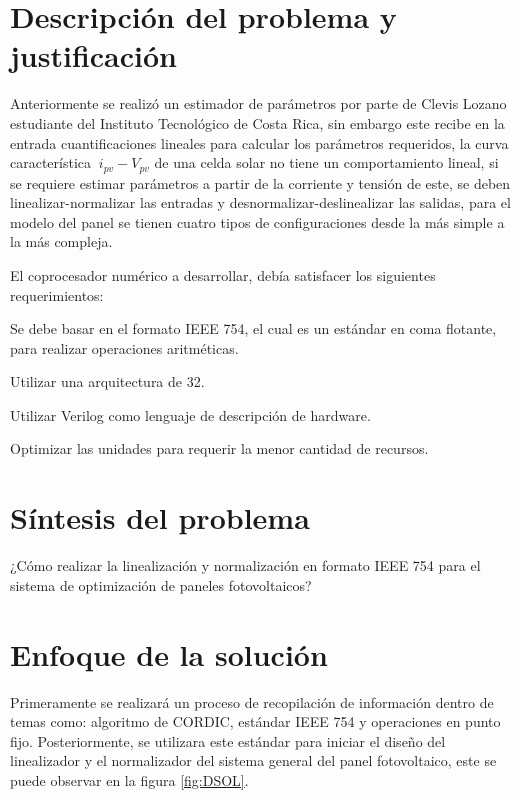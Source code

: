 \section{Descripción del problema y justificación}

Anteriormente se realizó un estimador de parámetros por parte de Clevis Lozano estudiante del Instituto Tecnológico de Costa Rica, sin embargo este recibe en la entrada cuantificaciones lineales para calcular los parámetros requeridos, la curva característica $\ i_{pv}-V_{pv}$ de una celda solar no tiene un comportamiento lineal, si se requiere estimar parámetros a partir de la corriente y tensión de este, se deben linealizar-normalizar las entradas y desnormalizar-deslinealizar las salidas, para el modelo del panel se tienen cuatro tipos de configuraciones desde la más simple a la más compleja.  

El coprocesador numérico a desarrollar, debía satisfacer los siguientes requerimientos:

\begin{compactitem}
\item Se debe basar en el formato IEEE 754, el cual es un estándar en coma flotante, para realizar operaciones aritméticas.
\item Utilizar una arquitectura de 32.
\item Utilizar Verilog como lenguaje de descripción de hardware.
\item Optimizar las unidades para requerir la menor cantidad de recursos.
\end{compactitem}

\section{Síntesis del problema}

¿Cómo realizar la linealización y normalización en formato IEEE 754 para el sistema de optimización de paneles fotovoltaicos?

\section{Enfoque de la solución}

Primeramente se realizará un proceso de recopilación de información dentro de temas como: algoritmo de CORDIC, estándar IEEE 754 y operaciones en punto fijo. Posteriormente, se utilizara este estándar para iniciar el diseño del linealizador y el normalizador del sistema general del panel fotovoltaico, este se puede observar en la figura \ref{fig:DSOL}. 

